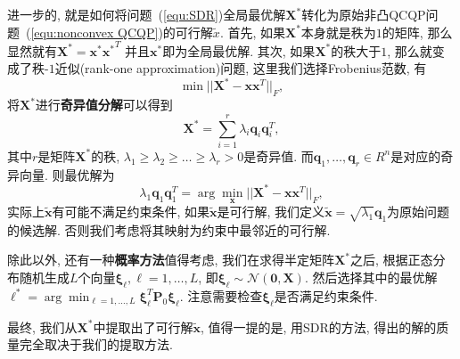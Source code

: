 \documentclass{article}
\begin{document}
进一步的, 就是如何将问题~(\ref{equ:SDR})全局最优解$\bm{X}^*$转化为原始非凸QCQP问题~(\ref{equ:nonconvex QCQP})的可行解$\tilde{x}$. 
首先, 如果$\bm{X}^*$本身就是秩为$1$的矩阵, 那么显然就有$\bm{X}^* = \bm{x}^* {\bm{x}^*}^T$ 并且$\bm{x}^*$即为全局最优解.
其次, 如果$\bm{X}^*$的秩大于$1$, 那么就变成了秩-$1$近似(rank-one approximation)问题, 这里我们选择Frobenius范数, 有
\begin{equation}
\min || \bm{X}^* - \bm{x}\bm{x}^T ||_F,
\end{equation}
将$\bm{X}^*$进行\textbf{奇异值分解}可以得到
\begin{equation}
\bm{X}^* = \sum_{i=1}^r \lambda_i \bm{q}_i \bm{q}_i^T,
\end{equation}
其中$r$是矩阵$\bm{X}^*$的秩, $\lambda_1 \ge \lambda_2 \ge \dots \ge \lambda_r > 0$是奇异值.
而$\bm{q}_1,\dots,\bm{q}_r \in R^n$是对应的奇异向量.
则最优解为
\begin{equation}
\lambda_1 \bm{q}_1 \bm{q}_1^T = \arg\min_{\bm{x}} ||\bm{X}^* - \bm{x}\bm{x}^T||_F,
\end{equation}
实际上$\tilde{\bm{x}}$有可能不满足约束条件, 如果$\tilde{\bm{x}}$是可行解, 我们定义$\tilde{\bm{x}} = \sqrt{\lambda_1}\bm{q}_1$为原始问题的候选解.
否则我们考虑将其映射为约束中最邻近的可行解.

除此以外, 还有一种\textbf{概率方法}值得考虑, 我们在求得半定矩阵$\bm{X}^*$之后, 根据正态分布随机生成$L$个向量$\bm{\xi}_{\ell}, \ell=1,\dots,L$, 即$\bm{\xi}_{\ell} \sim \mathcal{N}(\bm{0},\bm{X})$.
然后选择其中的最优解$\ell^* = \arg\min_{\ell=1,\dots,L} \bm{\xi}_{\ell}^T \bm{P}_0 \bm{\xi}_{\ell}$.
注意需要检查$\bm{\xi}_{\ell}$是否满足约束条件.

最终, 我们从$\bm{X}^*$中提取出了可行解$\tilde{\bm{x}}$, 值得一提的是, 用SDR的方法, 得出的解的质量完全取决于我们的提取方法.
\end{document}

